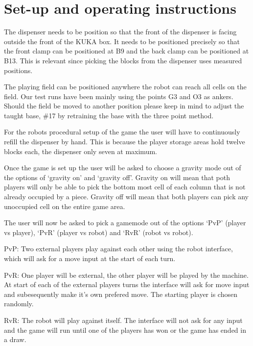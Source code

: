 \documentclass{article}
\begin{document}
    \makeHeader\newpage
    \tableofcontents
    \newpage
    \section{Set-up and operating instructions}
        The dispenser needs to be position so that the front of the dispenser is facing outside the front of the KUKA box. It needs to be positioned precisely so that the front clamp can be positioned at B9 and the back clamp can be positioned at B13. This is relevant since picking the blocks from the dispenser uses measured positions.
        
        The playing field can be positioned anywhere the robot can reach all cells on the field. Our test runs have been mainly using the points G3 and O3 as ankers. Should the field be moved to another position please keep in mind to adjust the taught base, \#17 by retraining the base with the three point method. 

        For the robots procedural setup of the game the user will have to continuously refill the dispenser by hand. This is because the player storage areas hold twelve blocks each, the dispenser only seven at maximum.

        Once the game is set up the user will be asked to choose a gravity mode out of the options of `gravity on' and `gravity off'. Gravity on will mean that poth players will only be able to pick the bottom most cell of each column that is not already occupied by a piece. Gravity off will mean that both players can pick any unoccupied cell on the entire game area.

        The user will now be asked to pick a gamemode out of the options `PvP' (player vs player), `PvR' (player vs robot) and `RvR' (robot vs robot). 
        
        PvP\@: Two external players play against each other using the robot interface, which will ask for a move input at the start of each turn. 
        
        PvR\@: One player will be external, the other player will be played by the machine. At start of each of the external players turns the interface will ask for move input and subesequently make it's own prefered move. The starting player is chosen randomly.
        
        RvR\@: The robot will play against itself. The interface will not ask for any input and the game will run until one of the players has won or the game has ended in a draw.
\end{document}
